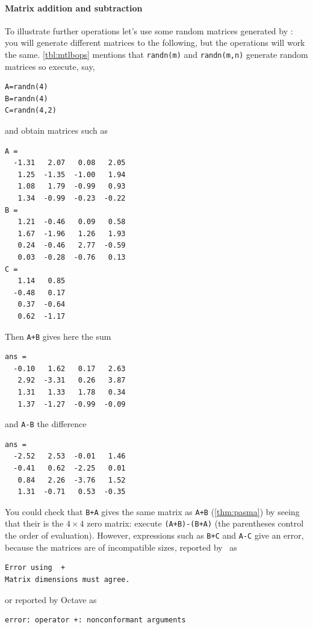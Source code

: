 \paragraph{Matrix addition and subtraction}
To illustrate further operations let's use some random matrices generated by \script: you will generate different matrices to the following, but the operations will work the same.
\cref{tbl:mtlbops} mentions that \verb|randn(m)| and \verb|randn(m,n)| generate random matrices so execute, say,
\begin{verbatim}
A=randn(4)
B=randn(4)
C=randn(4,2)
\end{verbatim}
and obtain matrices such as \twodp
\setbox\ajrqrbox\hbox{}%
\marginajrbox%
\begin{verbatim}
A =
  -1.31   2.07   0.08   2.05
   1.25  -1.35  -1.00   1.94
   1.08   1.79  -0.99   0.93
   1.34  -0.99  -0.23  -0.22
B =
   1.21  -0.46   0.09   0.58
   1.67  -1.96   1.26   1.93
   0.24  -0.46   2.77  -0.59
   0.03  -0.28  -0.76   0.13
C =
   1.14   0.85
  -0.48   0.17
   0.37  -0.64
   0.62  -1.17
\end{verbatim}
Then \verb|A+B| gives here the sum
\begin{verbatim}
ans =
  -0.10   1.62   0.17   2.63
   2.92  -3.31   0.26   3.87
   1.31   1.33   1.78   0.34
   1.37  -1.27  -0.99  -0.09
\end{verbatim}
and \verb|A-B| the difference
\begin{verbatim}
ans =
  -2.52   2.53  -0.01   1.46
  -0.41   0.62  -2.25   0.01
   0.84   2.26  -3.76   1.52
   1.31  -0.71   0.53  -0.35
\end{verbatim}
You could check that \verb|B+A| gives the same matrix as \verb|A+B| (\cref{thm:pasma}) by seeing that their  is the \(4\times4\) zero matrix: execute \verb|(A+B)-(B+A)| (the parentheses control the order of evaluation).
However, expressions such as \verb|B+C| and \verb|A-C| give an error, because the matrices are of incompatible sizes, reported by \script[1]\ as%
%
%
\begin{verbatim}
Error using  + 
Matrix dimensions must agree. 
\end{verbatim}
or reported by Octave as
\begin{verbatim}
error: operator +: nonconformant arguments 
\end{verbatim}


